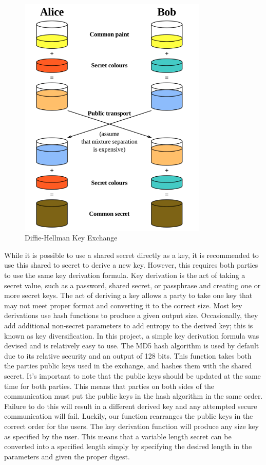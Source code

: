  \begin{figure}[t]
	\centering
	\includegraphics[width=9cm,height=0.7\textheight,keepaspectratio]{./figures/figure_3}
	\center\caption[font=footnote]{Diffie-Hellman Key Exchange}
\end{figure}

While it is possible to use a shared secret directly as a key, it is recommended to use this shared to secret to derive a new key. However, this requires both parties to use the same key derivation formula. Key derivation is the act of taking a secret value, such as a password, shared secret, or passphrase and creating one or more secret keys. The act of deriving a key allows a party to take one key that may not meet proper format and converting it to the correct size. Most key derivations use hash functions to produce a given output size. Occasionally, they add additional non-secret parameters to add entropy to the derived key; this is known as key diversification. In this project,  a simple key derivation formula was devised and is relatively easy to use. The MD5 hash algorithm is used by default due to its relative security and an output of 128 bits. This function takes both the parties public keys used in the exchange, and hashes them with the shared secret. It's important to note that the public keys should be updated at the same time for both parties. This means that parties on both sides of the communication must put the public keys in the hash algorithm in the same order. Failure to do this will result in a different derived key and any attempted secure communication will fail. Luckily, our function rearranges the public keys in the correct order for the users. The key derivation function will produce any size key as specified by the user. This means that a variable length secret can be converted into a specified length simply by specifying the desired length in the parameters and given the proper digest. 

